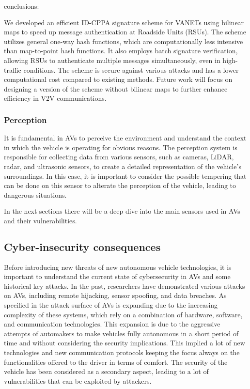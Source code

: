 conclusions:

We developed an efficient ID-CPPA signature scheme for VANETs using bilinear maps to speed up message authentication at Roadside Units (RSUs).
The scheme utilizes general one-way hash functions, which are computationally less intensive than map-to-point hash functions.
It also employs batch signature verification, allowing RSUs to authenticate multiple messages simultaneously, even in high-traffic conditions.
The scheme is secure against various attacks and has a lower computational cost compared to existing methods.
Future work will focus on designing a version of the scheme without bilinear maps to further enhance efficiency in V2V communications.


\subsubsection{Perception}\label{subsubsec:perception}
It is fundamental in AVs to perceive the environment and understand the context in which the vehicle is operating for obvious reasons.
The perception system is responsible for collecting data from various sensors, such as cameras, LiDAR, radar, and ultrasonic sensors, to create a detailed representation of the vehicle's surroundings.
In this case, it is important to consider the possible tempering that can be done on this sensor to alterate the perception of the vehicle, leading to dangerous situations.

In the next sections there will be a deep dive into the main sensors used in AVs and their vulnerabilities.


\subsection{Cyber-insecurity consequences}\label{subsec:cyber-insecurity}

Before introducing new threats of new autonomous vehicle technologies, it is important to understand the current state of cybersecurity in AVs and some historical key attacks.
In the past, researchers have demonstrated various attacks on AVs, including remote hijacking, sensor spoofing, and data breaches.
As specified in \cite{cybersec} the attack surface of AVs is expanding due to the increasing complexity of these systems, which rely on a combination of hardware, software, and communication technologies.
This expansion is due to the aggressive attempts of automakers to
make vehicles fully autonomous in a short period of time and without considering the security implications.
This implied a lot of new technologies and new communication protocols keeping the focus always on the functionalities offered to the driver in terms of comfort.
The security of the vehicle has been considered as a secondary aspect, leading to a lot of vulnerabilities that can be exploited by attackers.

